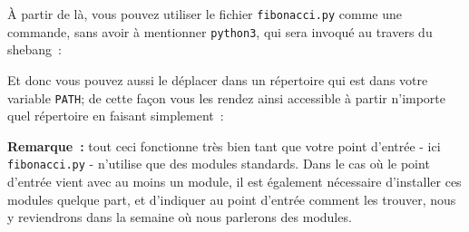     À partir de là, vous pouvez utiliser le fichier \texttt{fibonacci.py}
comme une commande, sans avoir à mentionner \texttt{python3}, qui sera
invoqué au travers du shebang~:

    \begin{Shaded}
\begin{Highlighting}[frame=lines,framerule=0.6mm,rulecolor=\color{asisframecolor}]
\NormalTok{$ }
\end{Highlighting}
\end{Shaded}

    Et donc vous pouvez aussi le déplacer dans un répertoire qui est dans
votre variable \texttt{PATH}; de cette façon vous les rendez ainsi
accessible à partir n'importe quel répertoire en faisant simplement~:

    \begin{Shaded}
\begin{Highlighting}[frame=lines,framerule=0.6mm,rulecolor=\color{asisframecolor}]
\NormalTok{$ } 
\end{Highlighting}
\end{Shaded}

    \begin{Shaded}
\begin{Highlighting}[frame=lines,framerule=0.6mm,rulecolor=\color{asisframecolor}]
\NormalTok{$ }
\NormalTok{$ }
\end{Highlighting}
\end{Shaded}

    \textbf{Remarque~:} tout ceci fonctionne très bien tant que votre point
d'entrée - ici \texttt{fibonacci.py} - n'utilise que des modules
standards. Dans le cas où le point d'entrée vient avec au moins un
module, il est également nécessaire d'installer ces modules quelque
part, et d'indiquer au point d'entrée comment les trouver, nous y
reviendrons dans la semaine où nous parlerons des modules.


    
    
    
